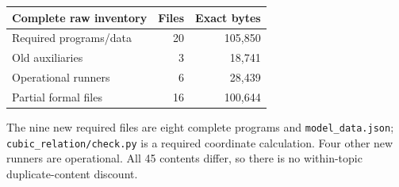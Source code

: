 \documentclass[10pt]{article}
\begin{document}
\begin{center}\begin{tabular}{lrr}\toprule
Complete raw inventory & Files & Exact bytes\\\midrule
Required programs/data & 20 & 105,850\\
Old auxiliaries & 3 & 18,741\\
Operational runners & 6 & 28,439\\
Partial formal files & 16 & 100,644\\
\bottomrule\end{tabular}\end{center}
The nine new required files are eight complete programs and
\texttt{model\_data.json}; \texttt{cubic\_relation/check.py} is a required coordinate
calculation. Four other new runners are operational. All 45 contents differ,
so there is no within-topic duplicate-content discount.
\end{document}

